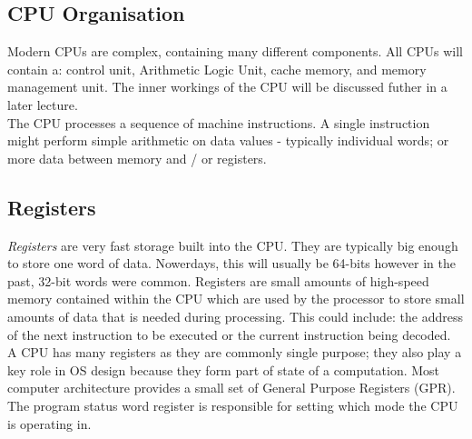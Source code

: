 \subsection{CPU Organisation}
Modern CPUs are complex, containing many different components. All CPUs will contain a: control unit, Arithmetic Logic Unit, cache memory, and memory management unit. The inner workings of the CPU will be discussed futher in a later lecture.\\

The CPU processes a sequence of machine instructions. A single instruction might perform simple arithmetic on data values - typically individual words; or more data between memory and / or registers.

\subsection{Registers}
\textit{Registers} are very fast storage built into the CPU. They are typically big enough to store one word of data. Nowerdays, this will usually be 64-bits however in the past, 32-bit words were common. Registers are small amounts of high-speed memory contained within the CPU which are used by the processor to store small amounts of data that is needed during processing. This could include: the address of the next instruction to be executed or the current instruction being decoded.\\

A CPU has many registers as they are commonly single purpose; they also play a key role in OS design because they form part of state of a computation. Most computer architecture provides a small set of General Purpose Registers (GPR). The program status word register is responsible for setting which mode the CPU is operating in. 


